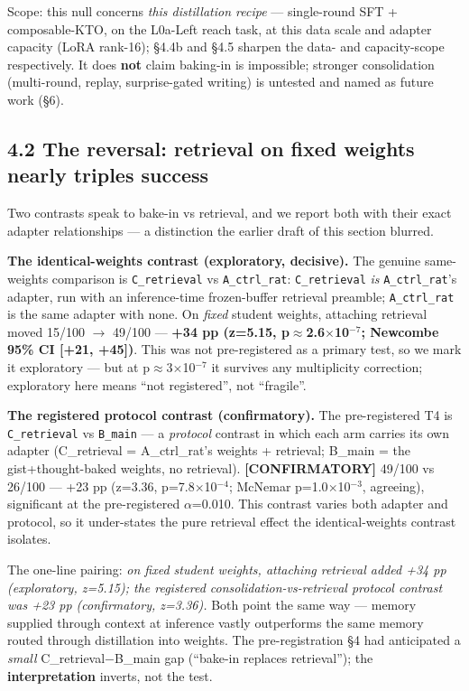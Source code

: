 Scope: this null concerns \emph{this distillation recipe} --- single-round
SFT + composable-KTO, on the L0a-Left reach task, at this data scale
and adapter capacity (LoRA rank-16); \S4.4b and \S4.5 sharpen the data-
and capacity-scope respectively. It does \textbf{not} claim baking-in is
impossible; stronger consolidation (multi-round, replay, surprise-gated
writing) is untested and named as future work (\S6).

\subsection*{4.2 The reversal: retrieval on fixed weights nearly triples success}

Two contrasts speak to bake-in vs retrieval, and we report both with
their exact adapter relationships --- a distinction the earlier draft of
this section blurred.

\textbf{The identical-weights contrast (exploratory, decisive).} The genuine
same-weights comparison is \texttt{C\_retrieval} vs \texttt{A\_ctrl\_rat}: \texttt{C\_retrieval}
\emph{is} \texttt{A\_ctrl\_rat}'s adapter, run with an inference-time frozen-buffer
retrieval preamble; \texttt{A\_ctrl\_rat} is the same adapter with none. On
\emph{fixed} student weights, attaching retrieval moved 15/100 $\rightarrow$ 49/100 ---
\textbf{+34 pp (z=5.15, p$\approx$2.6$\times$10$^{-7}$; Newcombe 95\% CI [+21, +45])}. This was
not pre-registered as a primary test, so we mark it exploratory --- but
at p$\approx$3$\times$10$^{-7}$ it survives any multiplicity correction; exploratory here
means ``not registered'', not ``fragile''.

\textbf{The registered protocol contrast (confirmatory).} The
pre-registered T4 is \texttt{C\_retrieval} vs \texttt{B\_main} --- a \emph{protocol} contrast
in which each arm carries its own adapter (C\_retrieval = A\_ctrl\_rat's
weights + retrieval; B\_main = the gist+thought-baked weights, no
retrieval). \textbf{[CONFIRMATORY]} 49/100 vs 26/100 --- +23 pp (z=3.36,
p=7.8$\times$10$^{-4}$; McNemar p=1.0$\times$10$^{-3}$, agreeing), significant at the
pre-registered $\alpha$=0.010. This contrast varies both adapter and protocol,
so it under-states the pure retrieval effect the identical-weights
contrast isolates.

The one-line pairing: \emph{on fixed student weights, attaching retrieval
added +34 pp (exploratory, z=5.15); the registered
consolidation-vs-retrieval protocol contrast was +23 pp (confirmatory,
z=3.36).} Both point the same way --- memory supplied through context at
inference vastly outperforms the same memory routed through
distillation into weights. The pre-registration \S4 had anticipated a
\emph{small} C\_retrieval$-$B\_main gap (``bake-in replaces retrieval''); the
\textbf{interpretation} inverts, not the test.

